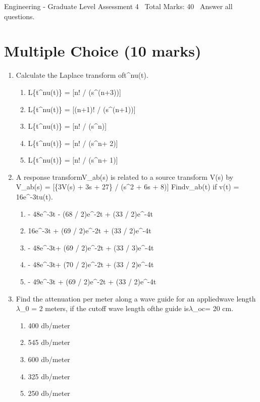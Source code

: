 \documentclass[12pt]{article}
\begin{document}
\begin{center}
Engineering - Graduate Level Assessment 4 \
Total Marks: 40 \
Answer all questions.
\end{center}

\section*{Multiple Choice (10 marks)}
\begin{enumerate}[label=\arabic*.]
\item Calculate the Laplace transform oft\^{}nu(t).
\begin{enumerate}[label=(\alph*)]
    \item L\{t\^{}nu(t)\} = [n! / (s\^{}(n+3))]
    \item L\{t\^{}nu(t)\} = [(n+1)! / (s\^{}(n+1))]
    \item L\{t\^{}nu(t)\} = [n! / (s\^{}n)]
    \item L\{t\^{}nu(t)\} = [n! / (s\^{}n+ 2)]
    \item L\{t\^{}nu(t)\} = [n! / (s\^{}n+ 1)]
\end{enumerate}
\item A response transformV\_ab(s) is related to a source transform V(s) by V\_ab(s) = [\{3V(s) +
3s + 27\} / (s\^{}2 + 6s + 8)] Findv\_ab(t) if v(t) = 16e\^{}-3tu(t).
\begin{enumerate}[label=(\alph*)]
    \item - 48e\^{}-3t - (68 / 2)e\^{}-2t + (33 / 2)e\^{}-4t
    \item 16e\^{}-3t + (69 / 2)e\^{}-2t + (33 / 2)e\^{}-4t
    \item - 48e\^{}-3t+ (69 / 2)e\^{}-2t + (33 / 3)e\^{}-4t
    \item - 48e\^{}-3t+ (70 / 2)e\^{}-2t + (33 / 2)e\^{}-4t
    \item - 49e\^{}-3t + (69 / 2)e\^{}-2t + (33 / 2)e\^{}-4t
\end{enumerate}
\item Find the attenuation per meter along a wave guide for an appliedwave length \ensuremath{\lambda}\_0 = 2
meters, if the cutoff wave length ofthe guide is\ensuremath{\lambda}\_oc= 20 cm.
\begin{enumerate}[label=(\alph*)]
    \item 400 db/meter
    \item 545 db/meter
    \item 600 db/meter
    \item 325 db/meter
    \item 250 db/meter

\end{enumerate}
\end{enumerate}
\end{document}
